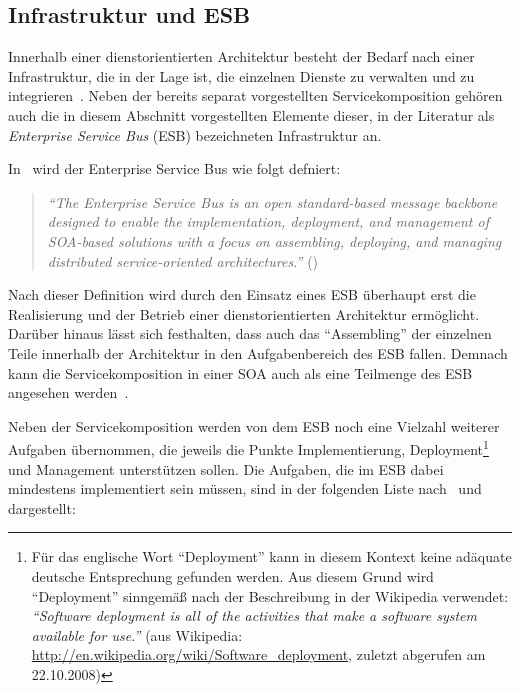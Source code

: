 
\subsection{Infrastruktur und ESB} %
\label{sub:infrastruktur}

  Innerhalb einer dienstorientierten Architektur besteht der Bedarf nach einer Infrastruktur, die in der Lage ist, die einzelnen Dienste zu verwalten und zu integrieren~\citep[S. 270]{web_services_principles_and_technology}. Neben der bereits separat vorgestellten Servicekomposition gehören auch die in diesem Abschnitt vorgestellten Elemente dieser, in der Literatur als \emph{Enterprise Service Bus} (ESB) bezeichneten Infrastruktur an.
  
  In~\citep{web_services_principles_and_technology} wird der Enterprise Service Bus wie folgt defniert:
  
  \begin{quote}
    \emph{"`The Enterprise Service Bus is an open standard-based message backbone designed to enable the implementation, deployment, and management of SOA-based solutions with a focus on assembling, deploying, and managing distributed service-oriented architectures."'} (\citep[S. 270]{web_services_principles_and_technology})
  \end{quote}
  
  Nach dieser Definition wird durch den Einsatz eines ESB überhaupt erst die Realisierung und der Betrieb einer dienstorientierten Architektur ermöglicht. Darüber hinaus lässt sich festhalten, dass auch das "`Assembling"' der einzelnen Teile innerhalb der Architektur in den Aufgabenbereich des ESB fallen. Demnach kann die Servicekomposition in einer SOA auch als eine Teilmenge des ESB angesehen werden~\citep[S. 3]{enterprise_service_bus}.

  Neben der Servicekomposition werden von dem ESB noch eine Vielzahl weiterer Aufgaben übernommen, die jeweils die Punkte Implementierung, Deployment\footnote{Für das englische Wort "`Deployment"' kann in diesem Kontext keine adäquate deutsche Entsprechung gefunden werden. Aus diesem Grund wird "`Deployment"' sinngemäß nach der Beschreibung in der Wikipedia verwendet: \emph{"`Software deployment is all of the activities that make a software system available for use."'} (aus Wikipedia: \url{http://en.wikipedia.org/wiki/Software_deployment}, zuletzt abgerufen am 22.10.2008)} und Management unterstützen sollen. Die Aufgaben, die im ESB dabei mindestens implementiert sein müssen, sind in der folgenden Liste nach~\citep[S. 137]{soa_goes_real} und~\citep[S. 146]{masak2007ssb} dargestellt:
  
